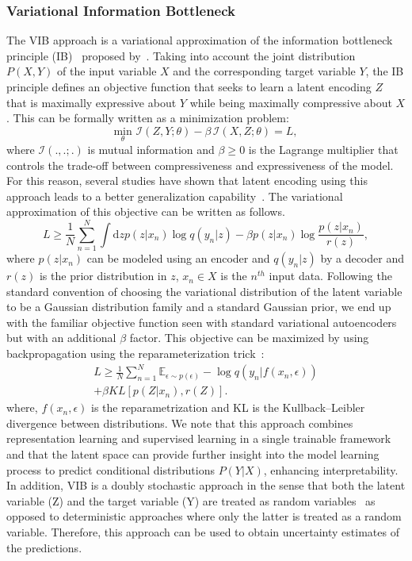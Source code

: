 \documentclass[12pt, twocolumn, apj]{openjournal}
\begin{document}
\subsubsection{Variational Information Bottleneck} The VIB approach is a variational approximation of the information bottleneck principle (IB)~\citep{tishby2000information} proposed by~\cite{alemi2017VIB}. Taking into account the joint distribution $P(X,Y)$ of the input variable $X$  and the corresponding target variable $Y$, the IB principle defines an objective function that seeks to learn a latent encoding $Z$ that is maximally expressive about $Y$ while being maximally compressive about $X$. This can be formally written as a minimization problem:
\begin{equation}\label{eq:elbo}
    \underset{\theta}{\mathrm{min}}\,\,\mathcal{I}(Z,Y;\theta) - \beta\,\mathcal{I}(X,Z;\theta) = L ,
\end{equation}
where $\mathcal{I}(.,.;.)$ is mutual information and $\beta \geq 0 $ is the Lagrange multiplier that controls the trade-off between compressiveness and expressiveness of the model. 
For this reason,  several studies have shown that latent encoding using this approach leads to a better generalization capability~\citep{alemi2017VIB,achille2018emergence}.
The variational approximation of this objective can be written as follows.
 \begin{equation*}
 L \geq \frac{1}{N} \sum_{n=1}^{N} \int \mathrm{d}z p(z|x_n) \log q(y_n|z) - \beta p(z|x_n)\log\frac{p(z|x_n)}{r(z)},
\end{equation*}
where $p(z|x_n)$ can be modeled using an encoder and $q(y_n|z)$ by a decoder and $r(z)$ is the prior distribution in $z$, $x_n \in X$ is the $n^{th}$ input data. Following the standard convention of choosing the variational distribution of the latent variable to be a Gaussian distribution family and a standard Gaussian prior, we end up with the familiar objective function seen with standard variational autoencoders but with an additional $\beta$ factor. This objective can be maximized by using backpropagation using the reparameterization trick~\citep{kingma2013auto}:
 \begin{multline*}
 L \geq \frac{1}{N} \sum_{n=1}^{N} \mathbb{E}_{\epsilon\sim p(\epsilon)} -\log q(y_n|f(x_n,\epsilon)) \\ + \beta KL [p(Z|x_n), r(Z)].
\end{multline*}
where, $f(x_n,\epsilon)$ is the reparametrization and KL is the Kullback–Leibler divergence between distributions. We note that this approach combines representation learning and supervised learning in a single trainable framework and that the latent space can provide further insight into the model learning process to predict conditional distributions $P(Y|X)$, enhancing interpretability. In addition, VIB is a doubly stochastic approach in the sense that both the latent variable (Z) and the target variable (Y) are treated as random variables~\citep{alemi2018uncertainty} as opposed to deterministic approaches where only the latter is treated as a random variable. Therefore, this approach can be used to obtain uncertainty estimates of the predictions. 
\end{document}
